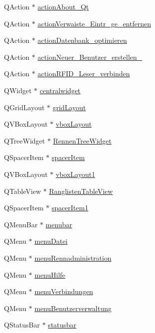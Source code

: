 \begin{CompactItemize}
QAction $\ast$ \hyperlink{class_ui___b_e_o___timing_class_d8ad45cd3a3828ddcec7600e63e8d845}{actionAbout\_\-Qt}
\item 
QAction $\ast$ \hyperlink{class_ui___b_e_o___timing_class_9dfca8038e5806d6a7bb1f004fe3c96f}{actionVerwaiste\_\-Eintr\_\-ge\_\-entfernen}
\item 
QAction $\ast$ \hyperlink{class_ui___b_e_o___timing_class_50b0c772b8508d73aa04cc938b6dd80e}{actionDatenbank\_\-optimieren}
\item 
QAction $\ast$ \hyperlink{class_ui___b_e_o___timing_class_687853281c5ba234eab8737392a620a0}{actionNeuer\_\-Benutzer\_\-erstellen\_}
\item 
QAction $\ast$ \hyperlink{class_ui___b_e_o___timing_class_f79465573d96a63961f3c088b29b3084}{actionRFID\_\-Leser\_\-verbinden}
\item 
QWidget $\ast$ \hyperlink{class_ui___b_e_o___timing_class_2e65534458d73079bc2d217bfd4fc903}{centralwidget}
\item 
QGridLayout $\ast$ \hyperlink{class_ui___b_e_o___timing_class_8589036be2703c8cb2aaac195c8ee083}{gridLayout}
\item 
QVBoxLayout $\ast$ \hyperlink{class_ui___b_e_o___timing_class_ff8f87706aad892dd2d20ed4f7b4c7fe}{vboxLayout}
\item 
QTreeWidget $\ast$ \hyperlink{class_ui___b_e_o___timing_class_ec5ef60597da04626e900f8ee0482d3b}{RennenTreeWidget}
\item 
QSpacerItem $\ast$ \hyperlink{class_ui___b_e_o___timing_class_b299f96ad3b1c549f9a2e636d298045f}{spacerItem}
\item 
QVBoxLayout $\ast$ \hyperlink{class_ui___b_e_o___timing_class_368e591e8cfe5881bee4457fe930f3f0}{vboxLayout1}
\item 
QTableView $\ast$ \hyperlink{class_ui___b_e_o___timing_class_276d00234a42b378490de034b6b49279}{RanglistenTableView}
\item 
QSpacerItem $\ast$ \hyperlink{class_ui___b_e_o___timing_class_dabf0adcf4e192d0d124daa4c9747cf1}{spacerItem1}
\item 
QMenuBar $\ast$ \hyperlink{class_ui___b_e_o___timing_class_429e6665cc4bbdb800fa60091a1df117}{menubar}
\item 
QMenu $\ast$ \hyperlink{class_ui___b_e_o___timing_class_a0576d6c6301fad2fd447ff0cb972232}{menuDatei}
\item 
QMenu $\ast$ \hyperlink{class_ui___b_e_o___timing_class_1b938bf6e75705f59c6e99dc594e6972}{menuRennadministration}
\item 
QMenu $\ast$ \hyperlink{class_ui___b_e_o___timing_class_d6638f230c96a963025511e7837dc3a7}{menuHilfe}
\item 
QMenu $\ast$ \hyperlink{class_ui___b_e_o___timing_class_a9c026ecb9e30cae0c32ed73b1dcad65}{menuVerbindungen}
\item 
QMenu $\ast$ \hyperlink{class_ui___b_e_o___timing_class_d5fc0b0efd6ae01875016c94b7f067c9}{menuBenutzerverwaltung}
\item 
QStatusBar $\ast$ \hyperlink{class_ui___b_e_o___timing_class_29a2b80779ba872f4a5fad93641d82ce}{statusbar}
\end{CompactItemize}


